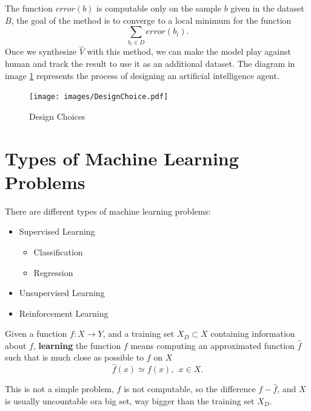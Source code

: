 \documentclass[10pt, letterpaper]{report}
\begin{document}
The function $error(b)$ is computable only on the sample $b$ given in the dataset $B$, the goal of the method is to converge to a local minimum for the function  \begin{equation}
    \sum_{b_i\in D}error(b_i).
\end{equation}
Once we synthesize $\hat V$ with this method, we can make the model play against human and track the result to use it as an additional dataset. The diagram in image \ref{img:DesignChoice} represents the process of designing an artificial intelligence agent.

\begin{figure}[h!]
    \centering
    \texttt{[image: images/DesignChoice.pdf]}
    \caption{Design Choices}
    \label{img:DesignChoice}
\end{figure}
\section{Types of Machine Learning Problems}
There are different types of machine learning problems:\begin{itemize}
    \item Supervised Learning\begin{itemize}
        \item Classification
        \item Regression
    \end{itemize}
    \item Unsupervised Learning
    \item Reinforcement Learning
\end{itemize}

\begin{definition}
    Given a function $f:X\rightarrow Y$, and a training set $X_D\subset X$ containing information about $f$, \textbf{learning} the function $f$ means computing an approximated function $\hat f$ such that is much close as possible to $f$ on $X$\begin{equation}
        \hat f(x)\simeq f(x), \ \ x\in X.
    \end{equation}
\end{definition}
This is not a simple problem, $f$ is not computable, so the difference $f-\hat f$, and $X$ is usually uncountable ora big set, way bigger than the training set $X_D$. \bigskip
\end{document}
